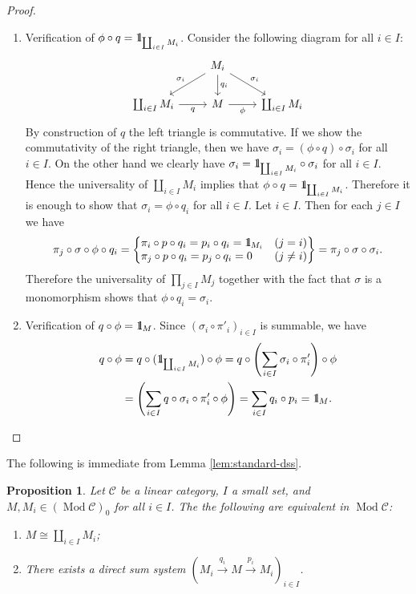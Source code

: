 \documentclass{surv-l}
\numberwithin{equation}{chapter}
\numberwithin{figure}{chapter}
\theoremstyle{plain}
\newtheorem{prp}[thm]{Proposition}
\theoremstyle{definition}
\theoremstyle{remark}
\newcommand{\id}{1\kern-.25em{\text{{\rm l}}}}
\newcommand{\Ar}[3]{\ar[from={#1}, to={#2}, #3]}
\DeclareMathOperator{\Mod}{Mod}
\begin{document}
\begin{proof}
\begin{enumerate}[wide, label=(\roman*)]
\item Verification of $\phi\circ q= \id_{\coprod_{i\in I}M_i}$.
Consider the following diagram for all $i \in I$:
\[
\begin{tikzcd}
& M_i\\
\coprod_{i\in I}M_i & M & \coprod_{i\in I}M_i
\Ar{1-2}{2-1}{"\sigma_i" '}
\Ar{1-2}{2-2}{"q_i"}
\Ar{1-2}{2-3}{"\sigma_i"}
\Ar{2-1}{2-2}{"q" '}
\Ar{2-2}{2-3}{"\phi" '}
\end{tikzcd}
\]
By construction of $q$ the left triangle is commutative.
If we show the commutativity of the right triangle, then
we have
$\sigma_i = (\phi \circ q) \circ \sigma_i$ for all $i \in I$.
On the other hand we clearly have
$\sigma_i = \id_{\coprod_{i\in I}M_i} \circ\sigma_i$ for all $i \in I$.
Hence the universality of $\coprod_{i\in I}M_i$ implies
that $\phi\circ q= \id_{\coprod_{i\in I}M_i}$.
Therefore it is enough to show that
$\sigma_i = \phi \circ q_i$ for all $i \in I$.
Let $i \in I$.
Then for each $j \in I$ we have
\[
\pi_j \circ \sigma \circ \phi \circ q_i =
\left\{
\hspace{-5pt}
\begin{array}{lc}
\pi_i \circ p \circ q_i
= p_i \circ q_i = \id_{M_i} & (j= i)\\
\pi_j \circ p \circ q_i = p_j \circ q_i = 0 & (j \ne i)
\end{array}
\hspace{-5pt}
\right\}
= \pi_j \circ \sigma \circ \sigma_i.
\]
Therefore the universality of $\prod_{j\in I}M_j$
together with the fact that $\sigma$ is a monomorphism
shows that $\phi \circ q_i = \sigma_i$.
\item Verification of $q \circ \phi = \id_M$.
Since $(\sigma_i \circ \pi'_i)_{i\in I}$ is summable, we have
\[
\begin{aligned}
q \circ \phi &= q \circ (\id_{\coprod_{i\in I}M_i}) \circ \phi
= q \circ \left(\sum_{i\in I}\sigma_i \circ \pi'_i\right) \circ \phi\\
&= \left(\sum_{i\in I}q \circ \sigma_i \circ \pi'_i\circ \phi\right)
= \sum_{i\in I}q_i \circ p_i = \id_M.
\end{aligned}
\]
\end{enumerate}
\end{proof}

The following is immediate from Lemma \ref{lem:standard-dss}.

\begin{prp}
Let ${\mathcal{C}}$ be a linear category, $I$ a small set, and
$M, M_i \in (\Mod{\mathcal{C}})_0$ for all $i\in I$.
The the following are equivalent in $\Mod{\mathcal{C}}$:
\begin{enumerate}
\item
$M \cong \coprod_{i\in I} M_i$;
\item
There exists a direct sum system $(M_i \xrightarrow{q_i} M \xrightarrow{p_i} M_i)_{i \in I}$.
\end{enumerate}
\end{prp}
\end{document}
